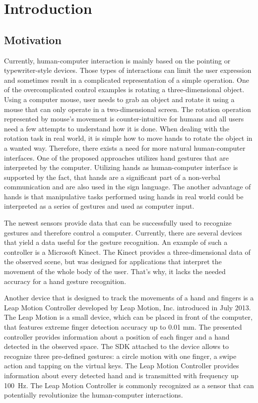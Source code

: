 \chapter{Introduction}

\section{Motivation}

Currently, human-computer interaction is mainly based on the pointing or typewriter-style devices. 
Those types of interactions can limit the user expression and sometimes result in a complicated representation of a simple operation.
One of the overcomplicated control examples is rotating a three-dimensional object.
Using a computer mouse, user needs to grab an object and rotate it using a mouse that can only operate in a two-dimensional screen. 
The rotation operation represented by mouse's movement is counter-intuitive for humans and all users need a few attempts to understand how it is done. 
When dealing with the rotation task in real world, it is simple how to move hands to rotate the object in a wanted way.
Therefore, there exists a need for more natural human-computer interfaces.
One of the proposed approaches utilizes hand gestures that are interpreted by the computer.
Utilizing hands as human-computer interface is supported by the fact, that hands are a significant part of a non-verbal communication and are also used in the sign language.
The another advantage of hands is that manipulative tasks performed using hands in real world could be interpreted as a series of gestures and used as computer input.

The newest sensors provide data that can be successfully used to recognize gestures and therefore control a computer.
Currently, there are several devices that yield a data useful for the gesture recognition. 
An example of such a controller is a Microsoft Kinect.
The Kinect provides a three-dimensional data of the observed scene, but was designed for applications that interpret the movement of the whole body of the user. 
That's why, it lacks the needed accuracy for a hand gesture recognition.
 
Another device that is designed to track the movements of a hand and fingers is a Leap Motion Controller developed by Leap Motion, Inc. introduced in July 2013. 
The Leap Motion is a small device, which can be placed in front of the computer, that features extreme finger detection accuracy up to 0.01 mm. 
The presented controller provides information about a position of each finger and a hand detected in the observed space.
The SDK attached to the device allows to recognize three pre-defined gestures: a circle motion with one finger, a swipe action and tapping on the virtual keys. 
The Leap Motion Controller provides information about every detected hand and is transmitted with frequency up 100~Hz. 
The Leap Motion Controller is commonly recognized as a sensor that can potentially revolutionize the human-computer interactions. 

